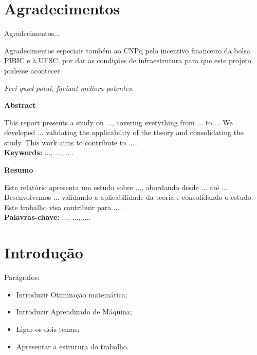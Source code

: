 \documentclass[a4paper,12pt]{report}
\theoremstyle{plain}
\theoremstyle{definition}
\begin{document}
	
	\newpage
	
	\chapter*{Agradecimentos}
	
	Agradecimentos...
	
	Agradecimentos especiais também ao CNPq pelo incentivo financeiro da bolsa PIBIC e à 
	UFSC, por dar as condições de infraestrutura para que este projeto pudesse acontecer. 
	
	\vspace*{\fill}
	\begin{flushright}
		\textit{Feci quod potui, faciant meliora potentes.}
	\end{flushright}
	
	\newpage
	\tableofcontents
	\newpage
	
	\begin{center}
		\large
		\textbf{Abstract}
	\end{center}
	
	\noindent This report presents a study on ..., covering everything from ... to ... We developed ... validating the applicability of the theory and consolidating the study. This work aims to contribute to ... .
	\\
	
	\noindent\textbf{Keywords:} ..., ..., ....
	
	
	\vspace{2cm}	
	\begin{center}
		\large
		\textbf{Resumo}
	\end{center}
	
	\noindent Este relatório apresenta um estudo sobre ..., abordando desde ... até ... Desenvolvemos ... validando a aplicabilidade da teoria e consolidando o estudo. Este trabalho visa contribuir para ... .
	\\
	
	\noindent\textbf{Palavras-chave:} ..., ..., ....

	\newpage
	\chapter{Introdução}
	Parágrafos:
	\begin{itemize}
		\item Introduzir Otimização matemática;
		\item Introduzir Aprendizado de Máquina;
		\item Ligar os dois temas;
		\item Apresentar a estrutura do trabalho.
	\end{itemize}
	
\end{document}
